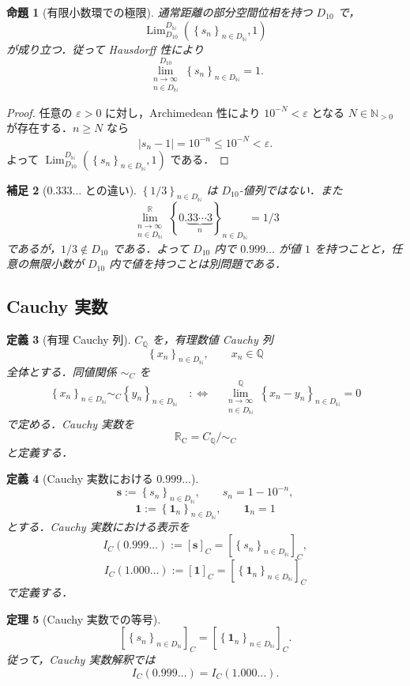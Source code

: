 \documentclass[a4paper,11pt]{ltjsarticle}
\theoremstyle{jpdef}
\newtheorem{definition}{定義}[section]
\newtheorem{remark}[definition]{補足}
\theoremstyle{jpthm}
\newtheorem{theorem}[definition]{定理}
\newtheorem{proposition}[definition]{命題}
\newcommand{\N}{\mathbb{N}}
\newcommand{\Q}{\mathbb{Q}}
\newcommand{\R}{\mathbb{R}}
\newcommand{\Lim}{\operatorname{Lim}}
\newcommand{\Ns}{\N_{>0}}
\newcommand{\DN}{D_{\N}}
\newcommand{\abs}[1]{\left\lvert#1\right\rvert}
\newcommand{\seq}[2]{\left\{#1\right\}_{#2}}
\newcommand{\RealC}{\mathbb{R}_{\mathrm C}}
\newcommand{\eps}{\varepsilon}
\begin{document}
\begin{proposition}[有限小数環での極限]
通常距離の部分空間位相を持つ \(D_{10}\) で，
\[
  \Lim_{D_{10}}^{\DN}(\seq{s_n}{n\in\DN},1)
\]
が成り立つ．従って Hausdorff 性により
\[
  \lim_{\substack{n\to\infty\\ n\in\DN}}^{D_{10}}\seq{s_n}{n\in\DN}=1.
\]
\end{proposition}

\begin{proof}
任意の \(\eps>0\) に対し，Archimedean 性により \(10^{-N}<\eps\) となる \(N\in\Ns\) が存在する．\(n\ge N\) なら
\[
  \abs{s_n-1}=10^{-n}\le 10^{-N}<\eps.
\]
よって \(\Lim_{D_{10}}^{\DN}(\seq{s_n}{n\in\DN},1)\) である．
\end{proof}

\begin{remark}[\(0.333\ldots\) との違い]
\(\seq{1/3}{n\in\DN}\) は \(D_{10}\)-値列ではない．また
\[
  \lim_{\substack{n\to\infty\\ n\in\DN}}^{\R}\seq{0.\underbrace{33\cdots3}_{n}}{n\in\DN}=1/3
\]
であるが，\(1/3\notin D_{10}\) である．よって \(D_{10}\) 内で \(0.999\ldots\) が値 \(1\) を持つことと，任意の無限小数が \(D_{10}\) 内で値を持つことは別問題である．
\end{remark}

\subsection{Cauchy 実数}

\begin{definition}[有理 Cauchy 列]
\(C_\Q\) を，有理数値 Cauchy 列
\[
  \seq{x_n}{n\in\DN},\qquad x_n\in\Q
\]
全体とする．同値関係 \(\sim_C\) を
\[
  \seq{x_n}{n\in\DN}\sim_C\seq{y_n}{n\in\DN}
  \quad:\Longleftrightarrow\quad
  \lim_{\substack{n\to\infty\\ n\in\DN}}^{\Q}\seq{x_n-y_n}{n\in\DN}=0
\]
で定める．Cauchy 実数を
\[
  \RealC=C_\Q/\sim_C
\]
と定義する．
\end{definition}

\begin{definition}[Cauchy 実数における \(0.999\ldots\)]
\[
  \mathbf s:=\seq{s_n}{n\in\DN},\qquad s_n=1-10^{-n},
\]
\[
  \mathbf 1:=\seq{\mathbf1_n}{n\in\DN},\qquad \mathbf1_n=1
\]
とする．Cauchy 実数における表示を
\[
  I_C(0.999\ldots):=[\mathbf s]_C=[\seq{s_n}{n\in\DN}]_C,
\]
\[
  I_C(1.000\ldots):=[\mathbf1]_C=[\seq{\mathbf1_n}{n\in\DN}]_C
\]
で定義する．
\end{definition}

\begin{theorem}[Cauchy 実数での等号]
\[
  [\seq{s_n}{n\in\DN}]_C=[\seq{\mathbf1_n}{n\in\DN}]_C.
\]
従って，Cauchy 実数解釈では
\[
  I_C(0.999\ldots)=I_C(1.000\ldots).
\]
\end{theorem}
\end{document}
